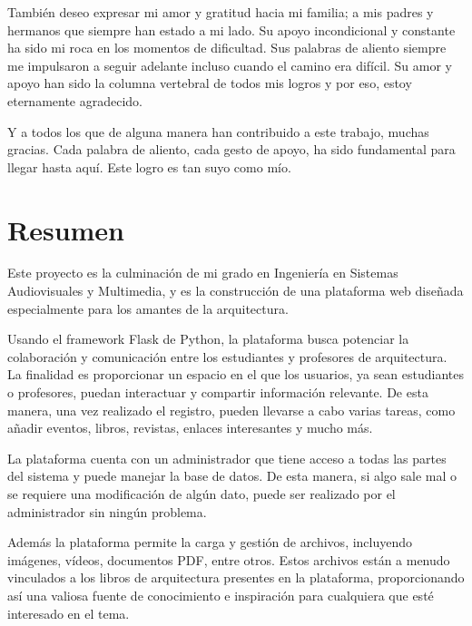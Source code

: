 \documentclass[a4paper, 12pt]{book}
\begin{document}
También deseo expresar mi amor y gratitud hacia mi familia; a mis padres y hermanos que siempre han estado a mi lado. 
Su apoyo incondicional y constante ha sido mi roca en los momentos de dificultad. Sus palabras de aliento siempre me 
impulsaron a seguir adelante incluso cuando el camino era difícil. Su amor y apoyo han sido la columna vertebral de 
todos mis logros y por eso, estoy eternamente agradecido. 

Y a todos los que de alguna manera han contribuido a este trabajo, muchas gracias. Cada palabra de aliento, cada 
gesto de apoyo, ha sido fundamental para llegar hasta aquí. Este logro es tan suyo como mío.



\chapter*{Resumen}

Este proyecto es la culminación de mi grado en Ingeniería en Sistemas Audiovisuales y Multimedia, y es la construcción de una 
plataforma web diseñada especialmente para los amantes de la arquitectura. 

Usando el framework Flask de Python, la plataforma busca potenciar la colaboración y comunicación entre los estudiantes y profesores 
de arquitectura. La finalidad es proporcionar un espacio en el que los usuarios, ya sean estudiantes o profesores, puedan interactuar y 
compartir información relevante. De esta manera, una vez realizado el registro, pueden llevarse a cabo varias tareas, como añadir 
eventos, libros, revistas, enlaces interesantes y mucho más.

La plataforma cuenta con un administrador que tiene acceso a todas las partes del sistema y puede manejar la base de datos. De esta 
manera, si algo sale mal o se requiere una modificación de algún dato, puede ser realizado por el administrador sin ningún problema.

Además la plataforma permite la carga y gestión de archivos, incluyendo imágenes, vídeos, documentos PDF, entre otros. Estos 
archivos están a menudo vinculados a los libros de arquitectura presentes en la plataforma, proporcionando así una valiosa fuente de 
conocimiento e inspiración para cualquiera que esté interesado en el tema. 
\end{document}
